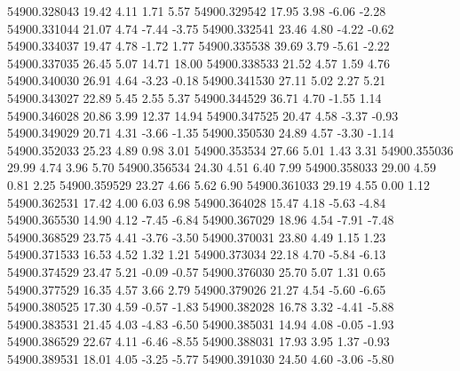 54900.328043       19.42        4.11        1.71        5.57
54900.329542       17.95        3.98       -6.06       -2.28
54900.331044       21.07        4.74       -7.44       -3.75
54900.332541       23.46        4.80       -4.22       -0.62
54900.334037       19.47        4.78       -1.72        1.77
54900.335538       39.69        3.79       -5.61       -2.22
54900.337035       26.45        5.07       14.71       18.00
54900.338533       21.52        4.57        1.59        4.76
54900.340030       26.91        4.64       -3.23       -0.18
54900.341530       27.11        5.02        2.27        5.21
54900.343027       22.89        5.45        2.55        5.37
54900.344529       36.71        4.70       -1.55        1.14
54900.346028       20.86        3.99       12.37       14.94
54900.347525       20.47        4.58       -3.37       -0.93
54900.349029       20.71        4.31       -3.66       -1.35
54900.350530       24.89        4.57       -3.30       -1.14
54900.352033       25.23        4.89        0.98        3.01
54900.353534       27.66        5.01        1.43        3.31
54900.355036       29.99        4.74        3.96        5.70
54900.356534       24.30        4.51        6.40        7.99
54900.358033       29.00        4.59        0.81        2.25
54900.359529       23.27        4.66        5.62        6.90
54900.361033       29.19        4.55        0.00        1.12
54900.362531       17.42        4.00        6.03        6.98
54900.364028       15.47        4.18       -5.63       -4.84
54900.365530       14.90        4.12       -7.45       -6.84
54900.367029       18.96        4.54       -7.91       -7.48
54900.368529       23.75        4.41       -3.76       -3.50
54900.370031       23.80        4.49        1.15        1.23
54900.371533       16.53        4.52        1.32        1.21
54900.373034       22.18        4.70       -5.84       -6.13
54900.374529       23.47        5.21       -0.09       -0.57
54900.376030       25.70        5.07        1.31        0.65
54900.377529       16.35        4.57        3.66        2.79
54900.379026       21.27        4.54       -5.60       -6.65
54900.380525       17.30        4.59       -0.57       -1.83
54900.382028       16.78        3.32       -4.41       -5.88
54900.383531       21.45        4.03       -4.83       -6.50
54900.385031       14.94        4.08       -0.05       -1.93
54900.386529       22.67        4.11       -6.46       -8.55
54900.388031       17.93        3.95        1.37       -0.93
54900.389531       18.01        4.05       -3.25       -5.77
54900.391030       24.50        4.60       -3.06       -5.80
